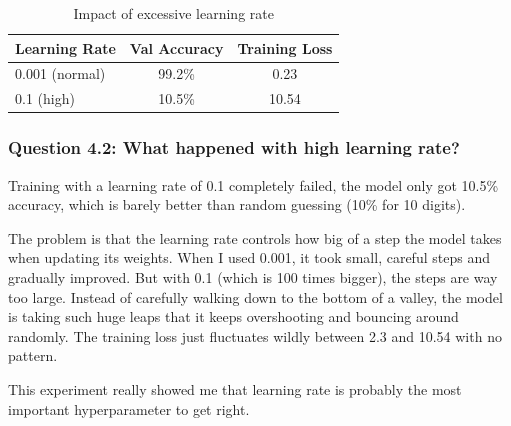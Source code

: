 \begin{table}[h]
\centering
\begin{tabular}{|l|c|c|}
\hline
\textbf{Learning Rate} & \textbf{Val Accuracy} & \textbf{Training Loss} \\ \hline
0.001 (normal) & 99.2\% & 0.23 \\ \hline
0.1 (high) & 10.5\% & 10.54 \\ \hline
\end{tabular}
\caption{Impact of excessive learning rate}
\label{tab:lr-comparison}
\end{table}

\subsubsection{Question 4.2: What happened with high learning rate?}

Training with a learning rate of 0.1 completely failed, the model only got 10.5\% accuracy, which is barely better than random guessing (10\% for 10 digits). 

The problem is that the learning rate controls how big of a step the model takes when updating its weights. When I used 0.001, it took small, careful steps and gradually improved. But with 0.1 (which is 100 times bigger), the steps are way too large. Instead of carefully walking down to the bottom of a valley, the model is taking such huge leaps that it keeps overshooting and bouncing around randomly. The training loss just fluctuates wildly between 2.3 and 10.54 with no pattern.

This experiment really showed me that learning rate is probably the most important hyperparameter to get right.